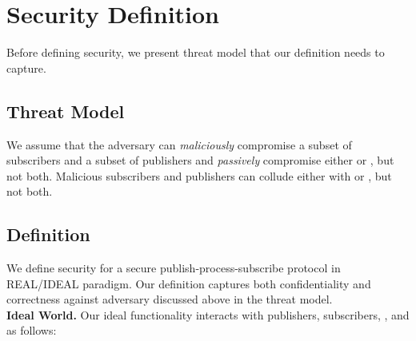 \section{Security Definition}
\label{sec:definition}

Before defining security, we present threat model that our definition needs to
capture.


\vspace{-10pt}
\subsection{Threat Model} We assume that the adversary can \emph{maliciously}
compromise a subset of subscribers and a subset of publishers and
\emph{passively} compromise either \broker or \garbler, but not both.
Malicious subscribers and publishers can collude either with \garbler or
\broker, but not both.

\vspace{-10pt}
\subsection{Definition}

We define security for a secure publish-process-subscribe protocol in
REAL/IDEAL paradigm. Our definition captures both confidentiality and
correctness against adversary discussed above in the threat model.\\[6pt]
\noindent\textbf{Ideal World.}
Our ideal functionality \F interacts with publishers, subscribers, \broker, and
\garbler as follows:

